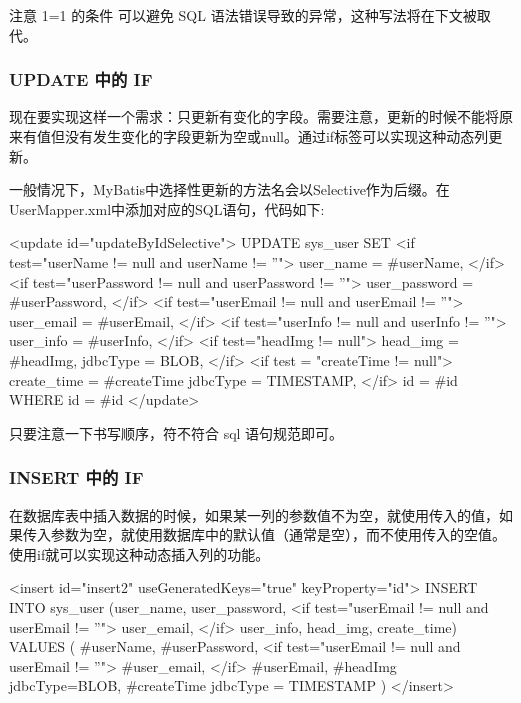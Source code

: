 注意 1=1 的条件 可以避免 SQL 语法错误导致的异常，这种写法将在下文被取代。

\subsubsection*{UPDATE 中的 IF}

现在要实现这样一个需求：只更新有变化的字段。需要注意，更新的时候不能将原来有值但没有发生变化的字段更新为空或null。通过if标签可以实现这种动态列更新。

一般情况下，MyBatis中选择性更新的方法名会以Selective作为后缀。在UserMapper.xml中添加对应的SQL语句，代码如下:

\begin{xml}
<update id="updateByIdSelective">
    UPDATE sys_user
    SET
    <if test="userName != null and userName != ''">
        user_name = #{userName},
    </if>
    <if test="userPassword != null and userPassword != ''">
        user_password = #{userPassword},
    </if>
    <if test="userEmail != null and userEmail != ''">
        user_email = #{userEmail},
    </if>
    <if test="userInfo != null and userInfo != ''">
        user_info = #{userInfo},
    </if>
    <if test="headImg != null">
        head_img = #{headImg, jdbcType = BLOB},
    </if>
    <if test = "createTime != null">
        create_time = #{createTime jdbcType = TIMESTAMP},
    </if>
    id = #{id}
    WHERE id = #{id}
</update>
\end{xml}

只要注意一下书写顺序，符不符合 sql 语句规范即可。

\subsubsection*{INSERT 中的 IF}

在数据库表中插入数据的时候，如果某一列的参数值不为空，就使用传入的值，如果传入参数为空，就使用数据库中的默认值（通常是空），而不使用传入的空值。使用if就可以实现这种动态插入列的功能。

\begin{xml}
<insert id="insert2" useGeneratedKeys="true" keyProperty="id">
    INSERT INTO sys_user (user_name, user_password,
        <if test="userEmail != null and userEmail != ''">
            user_email,
        </if>
        user_info, head_img, create_time)
    VALUES (
        #{userName}, #{userPassword},
        <if test="userEmail != null and userEmail != ''">
            #{user_email},
        </if>
        #{userEmail}, #{headImg jdbcType=BLOB}, #{createTime jdbcType = TIMESTAMP}
    )
</insert>
\end{xml}



















\newpage